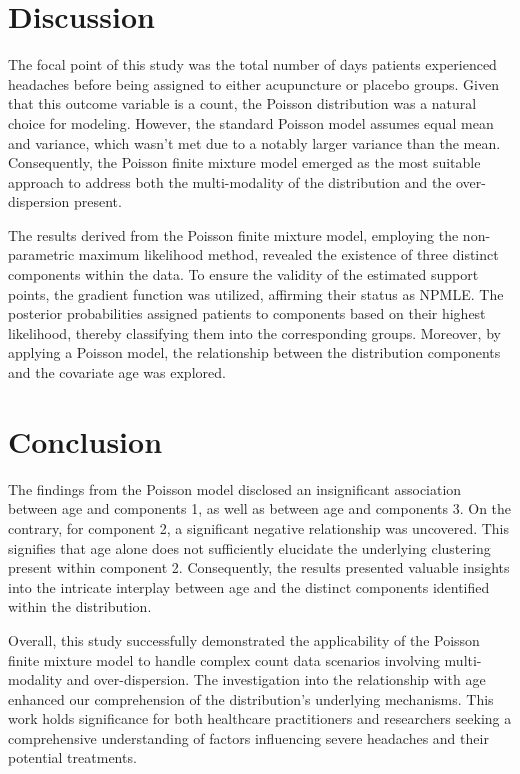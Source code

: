\documentclass[a4paper, 12pt]{article}
\begin{document}
\section{Discussion}
The focal point of this study was the total number of days patients experienced headaches before being assigned to either acupuncture or placebo groups. Given that this outcome variable is a count, the Poisson distribution was a natural choice for modeling. However, the standard Poisson model assumes equal mean and variance, which wasn't met due to a notably larger variance than the mean. Consequently, the Poisson finite mixture model emerged as the most suitable approach to address both the multi-modality of the distribution and the over-dispersion present.

The results derived from the Poisson finite mixture model, employing the non-parametric maximum likelihood method, revealed the existence of three distinct components within the data. To ensure the validity of the estimated support points, the gradient function was utilized, affirming their status as NPMLE. The posterior probabilities assigned patients to components based on their highest likelihood, thereby classifying them into the corresponding groups. Moreover, by applying a Poisson model, the relationship between the distribution components and the covariate age was explored.

\section{Conclusion}
The findings from the Poisson model disclosed an insignificant association between age and components 1, as well as between age and components 3. On the contrary, for component 2, a significant negative relationship was uncovered. This signifies that age alone does not sufficiently elucidate the underlying clustering present within component 2. Consequently, the results presented valuable insights into the intricate interplay between age and the distinct components identified within the distribution.

Overall, this study successfully demonstrated the applicability of the Poisson finite mixture model to handle complex count data scenarios involving multi-modality and over-dispersion. The investigation into the relationship with age enhanced our comprehension of the distribution's underlying mechanisms. This work holds significance for both healthcare practitioners and researchers seeking a comprehensive understanding of factors influencing severe headaches and their potential treatments.
\newpage
\end{document}
